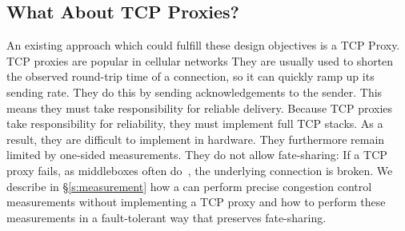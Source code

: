 \subsection{What About TCP Proxies?}\label{s:design:prior}
\begin{outline}
\1 An existing approach which could fulfill these design objectives is a TCP Proxy.
    \2 TCP proxies are popular in cellular networks
    \2 They are usually used to shorten the observed round-trip time of a connection, so it can quickly ramp up its sending rate.
    \2 They do this by sending acknowledgements to the sender.  
        \3 This means they must take responsibility for reliable delivery.
    \2 Because TCP proxies take responsibility for reliability, they must implement full TCP stacks.
        \3 As a result, they are difficult to implement in hardware. 
    \2 They furthermore remain limited by one-sided measurements.
    \2 They do not allow fate-sharing:
        \3 If a TCP proxy fails, as middleboxes often do~\cite{aplomb}, the underlying connection is broken.
\1 We describe in \S\ref{s:measurement} how a \name can perform precise congestion control measurements without implementing a TCP proxy
    \2 and how to perform these measurements in a fault-tolerant way that preserves fate-sharing.
\end{outline}

